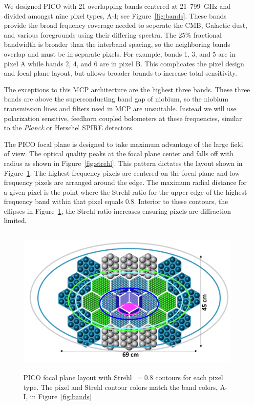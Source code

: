 \documentclass[]{spie}  %
\begin{document}
We designed PICO with 21 overlapping bands centered at 21--799~GHz and divided amongst nine pixel types, A-I; see Figure~\ref{fig:bands}. 
These bands provide the broad fequency coverage needed to seperate the CMB, Galactic dust, and various foregrounds using their differing spectra.  
The 25\% fractional bandwidth is broader than the interband spacing, so the neighboring bands overlap and must be in separate pixels.  
For example, bands 1, 3, and 5 are in pixel A while bands 2, 4, and 6 are in pixel B.  This 
complicates the pixel design and focal plane layout, but allows broader brands to increase total sensitivity.  

The exceptions to this MCP architecture are the highest three bands.  These three bands are above the superconducting band gap of niobium, so 
the niobium transmission lines and filters used in MCP are unsuitable.  Instead we will use polarization sensitive, feedhorn 
coupled bolometers at these frequencies, similar to the \textit{Planck}\cite{planck2010_hfi} or Herschel SPIRE\cite{spire2010} detectors.  

The PICO focal plane is designed to take maximum advantage of the large field of view.  The optical quality peaks at the 
focal plane center and falls off with radius as shown in Figure~\ref{fig:strehl}.  This pattern dictates the layout shown 
in Figure~\ref{fig:focal_plane}. The highest frequency pixels are centered on the focal plane and low frequency pixels are arranged 
around the edge. The maximum radial distance for a given pixel is the point where 
the Strehl ratio for the upper edge of the highest frequency band within that pixel equals 0.8.  Interior to these contours, the ellipses in 
Figure~\ref{fig:focal_plane}, the Strehl ratio increases ensuring pixels are diffraction limited.

\begin{figure} [ht]
\begin{center}
\includegraphics[height=7.5cm]{version3_focal_plane.png}
\end{center}
\caption { \label{fig:focal_plane} 
PICO focal plane layout with Strehl~$=0.8$ contours for each pixel type. The pixel and Strehl contour colors match the band colors, A-I, 
in Figure~\ref{fig:bands} }
\end{figure} 
\end{document}
